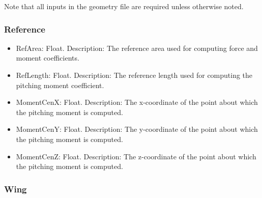 \documentclass[11pt]{article}
\begin{document}
\noindent Note that all inputs in the geometry file are required unless
otherwise noted.

\subsubsection{Reference}

\begin{itemize}
	\item RefArea: Float. Description: The reference area used for computing
		force and moment coefficients.
	\item RefLength: Float. Description: The reference length used for computing
		the pitching moment coefficient.
	\item MomentCenX: Float. Description: The x-coordinate of the point about
		which the pitching moment is computed.
	\item MomentCenY: Float. Description: The y-coordinate of the point about
		which the pitching moment is computed.
	\item MomentCenZ: Float. Description: The z-coordinate of the point about
		which the pitching moment is computed.
\end{itemize}

\subsubsection{Wing}
\end{document}
